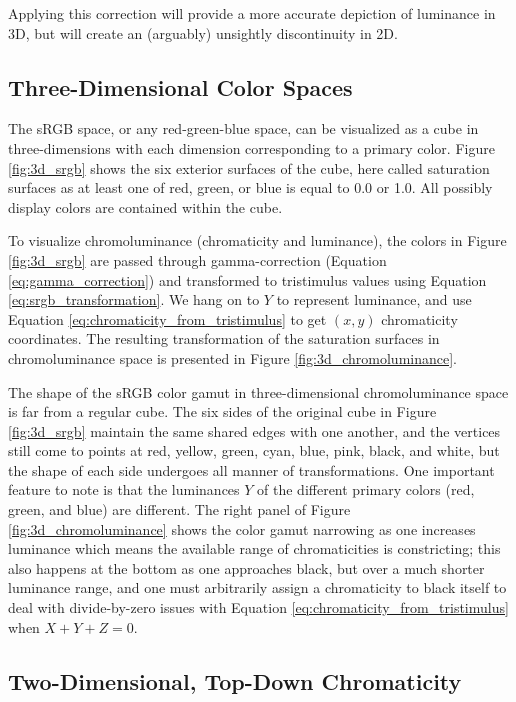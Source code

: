 \documentclass{article}
\begin{document}
\begin{multicols}{2}
Applying this correction will provide a more accurate depiction of luminance in 3D, but will create an (arguably) unsightly discontinuity in 2D.

\subsection{Three-Dimensional Color Spaces} %

The sRGB space, or any red-green-blue space, can be visualized as a cube in three-dimensions with each dimension corresponding to a primary color.  Figure \ref{fig:3d_srgb} shows the six exterior surfaces of the cube, here called saturation surfaces as at least one of red, green, or blue is equal to 0.0 or 1.0.  All possibly display colors are contained within the cube.

To visualize chromoluminance (chromaticity and luminance), the colors in Figure \ref{fig:3d_srgb} are passed through gamma-correction (Equation \ref{eq:gamma_correction}) and transformed to tristimulus values using Equation \ref{eq:srgb_transformation}.  We hang on to $Y$ to represent luminance, and use Equation \ref{eq:chromaticity_from_tristimulus} to get $(x,y)$ chromaticity coordinates.  The resulting transformation of the saturation surfaces in chromoluminance space is presented in Figure \ref{fig:3d_chromoluminance}.

The shape of the sRGB color gamut in three-dimensional chromoluminance space is far from a regular cube.  The six sides of the original cube in Figure \ref{fig:3d_srgb} maintain the same shared edges with one another, and the vertices still come to points at red, yellow, green, cyan, blue, pink, black, and white, but the shape of each side undergoes all manner of transformations.  One important feature to note is that the luminances $Y$ of the different primary colors (red, green, and blue) are different.  The right panel of Figure \ref{fig:3d_chromoluminance} shows the color gamut narrowing as one increases luminance which means the available range of chromaticities is constricting; this also happens at the bottom as one approaches black, but over a much shorter luminance range, and one must arbitrarily assign a chromaticity to black itself to deal with divide-by-zero issues with Equation \ref{eq:chromaticity_from_tristimulus} when $X+Y+Z=0$.

\subsection{Two-Dimensional, Top-Down Chromaticity} %


\end{multicols}
\end{document}
